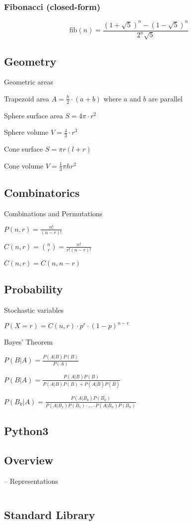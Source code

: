 \documentclass[8pt,a4paper,landscape,oneside]{amsart}
\newcommand{\code}[1]{\inputminted[fontsize=\normalsize,baselinestretch=1]{python}{code/#1}}
\begin{document}
\begin{multicols*}{3}
        \subsubsection{Fibonacci (closed-form)}
            $$\text{fib}(n) = \frac{(1+\sqrt{5})^n - (1-\sqrt{5})^n}{2^n\sqrt{5}}$$

    \subsection{Geometry}
        Geometric areas
    
        Trapezoid area $A = \frac{h}{2} \cdot (a + b)$ where $a$ and $b$ are parallel

        Sphere surface area $S = 4\pi \cdot r^2$
        
        Sphere volume $V = \frac{4}{3} \cdot r^3$
        
        Cone surface $S = \pi r(l+r)$
        
        Cone volume $V = \frac{1}{3}\pi hr^2$

    \subsection{Combinatorics}
        Combinations and Permutations
        
        $P(n,r) = \frac{n!}{(n-r)!}$
        
        $C(n,r) = \binom{n}{r} = \frac{n!}{r!(n-r)!}$
        
        $C(n,r) = C(n, n-r)$
        

    \subsection{Probability} Stochastic variables

        $P(X=r) = C(n,r) \cdot p^r \cdot (1-p)^{n-r}$

        Bayes' Theorem

        $P(B|A) = \frac{P(A|B) P(B)}{P(A)}$
        
        $P(B|A) = \frac{P(A|B)P(B)}{P(A|B)P(B) + P(A|\bar{B})P(\bar{B})}$
        
        $P(B_k|A) = \frac{P(A|B_k)P(B_k)}{P(A|B_1)P(B_1) \cdot ... \cdot P(A|B_n)P(B_n)}$

\end{multicols*}

\onecolumn
\begin{multicols*}{3}
    \section{Python3}
    \subsection{Overview}
    -- Representations
        \code{python_overview.py}
    \subsection{Standard Library}
\end{multicols*}
\end{document}
